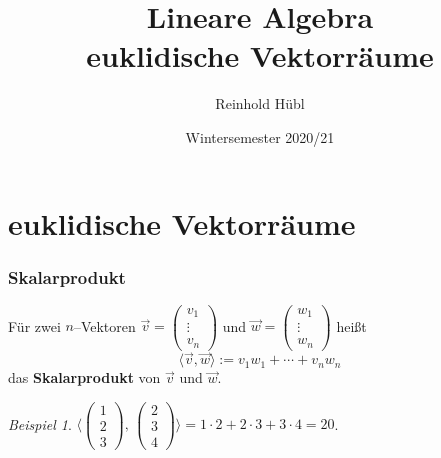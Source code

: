 \documentclass[hyperref={pdfpagelabels=false}]{beamer}
\title{Lineare Algebra \\ euklidische Vektorräume}
\author{ Reinhold Hübl}
\date{Wintersemester 2020/21}
\theoremstyle{plain}%
\theoremstyle{definition}
\theoremstyle{remark}
\newtheorem*{beispiel}{Beispiel}
\newcommand{\vektor}[1]{\overrightarrow{#1}}
\begin{document}
\begin{frame}
\titlepage
\centering 
 
\end{frame} 



\section{euklidische Vektorräume}


\begin{frame}
\frametitle{Skalarprodukt}

\begin{definition}
Für zwei $n$--Vektoren $\vektor{v} = \left( \begin{matrix} v_1 \\ \vdots \\  v_n \end{matrix} 
\right)$ und  $\vektor{w} = \left( \begin{matrix} w_1 \\  \vdots \\ w_n \end{matrix} \right)$ 
heißt
  	$$ \langle \vektor{v}, \vektor{w} \rangle := v_1 w_1 + \cdots + v_n w_n $$
das \textbf{Skalarprodukt} von $\vektor{v}$ und $\vektor{w}$.
\end{definition}

\pause 
\begin{beispiel}
$ \langle  \left( \begin{matrix} 1 \\ 2 \\ 3  \end{matrix} \right), \,
\left( \begin{matrix} 2 \\ 3 \\ 4   \end{matrix} \right) \rangle 
= 1 \cdot 2 + 2 \cdot 3 + 3 \cdot 4  = 20$.
\end{beispiel}

\end{frame}
\end{document}
